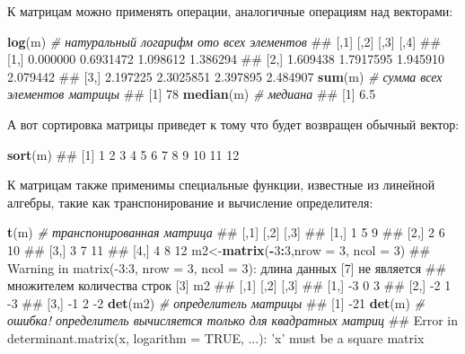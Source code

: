 \documentclass[]{book}
\newenvironment{Shaded}{\begin{snugshade}}{\end{snugshade}}
\newcommand{\KeywordTok}[1]{\textcolor[rgb]{0.13,0.29,0.53}{\textbf{#1}}}
\newcommand{\DataTypeTok}[1]{\textcolor[rgb]{0.13,0.29,0.53}{#1}}
\newcommand{\DecValTok}[1]{\textcolor[rgb]{0.00,0.00,0.81}{#1}}
\newcommand{\CommentTok}[1]{\textcolor[rgb]{0.56,0.35,0.01}{\textit{#1}}}
\newcommand{\OperatorTok}[1]{\textcolor[rgb]{0.81,0.36,0.00}{\textbf{#1}}}
\newcommand{\NormalTok}[1]{#1}
\begin{document}
К матрицам можно применять операции, аналогичные операциям над
векторами:

\begin{Shaded}
\begin{Highlighting}[]
\KeywordTok{log}\NormalTok{(m)  }\CommentTok{# натуральный логарифм ото всех элементов}
\NormalTok{##          [,1]      [,2]     [,3]     [,4]}
\NormalTok{## [1,] 0.000000 0.6931472 1.098612 1.386294}
\NormalTok{## [2,] 1.609438 1.7917595 1.945910 2.079442}
\NormalTok{## [3,] 2.197225 2.3025851 2.397895 2.484907}
\KeywordTok{sum}\NormalTok{(m)  }\CommentTok{# сумма всех элементов матрицы}
\NormalTok{## [1] 78}
\KeywordTok{median}\NormalTok{(m) }\CommentTok{# медиана}
\NormalTok{## [1] 6.5}
\end{Highlighting}
\end{Shaded}

А вот сортировка матрицы приведет к тому что будет возвращен обычный
вектор:

\begin{Shaded}
\begin{Highlighting}[]
\KeywordTok{sort}\NormalTok{(m)}
\NormalTok{##  [1]  1  2  3  4  5  6  7  8  9 10 11 12}
\end{Highlighting}
\end{Shaded}

К матрицам также применимы специальные функции, известные из линейной
алгебры, такие как транспонирование и вычисление определителя:

\begin{Shaded}
\begin{Highlighting}[]
\KeywordTok{t}\NormalTok{(m)  }\CommentTok{# транспонированная матрица}
\NormalTok{##      [,1] [,2] [,3]}
\NormalTok{## [1,]    1    5    9}
\NormalTok{## [2,]    2    6   10}
\NormalTok{## [3,]    3    7   11}
\NormalTok{## [4,]    4    8   12}
\NormalTok{m2<-}\KeywordTok{matrix}\NormalTok{(}\OperatorTok{-}\DecValTok{3}\OperatorTok{:}\DecValTok{3}\NormalTok{,}\DataTypeTok{nrow =} \DecValTok{3}\NormalTok{, }\DataTypeTok{ncol =} \DecValTok{3}\NormalTok{)}
\NormalTok{## Warning in matrix(-3:3, nrow = 3, ncol = 3): длина данных [7] не является}
\NormalTok{## множителем количества строк [3]}
\NormalTok{m2}
\NormalTok{##      [,1] [,2] [,3]}
\NormalTok{## [1,]   -3    0    3}
\NormalTok{## [2,]   -2    1   -3}
\NormalTok{## [3,]   -1    2   -2}
\KeywordTok{det}\NormalTok{(m2) }\CommentTok{# определитель матрицы}
\NormalTok{## [1] -21}
\KeywordTok{det}\NormalTok{(m)  }\CommentTok{# ошибка! определитель вычисляется только для квадратных матриц}
\NormalTok{## Error in determinant.matrix(x, logarithm = TRUE, ...): 'x' must be a square matrix}
\end{Highlighting}
\end{Shaded}
\end{document}
